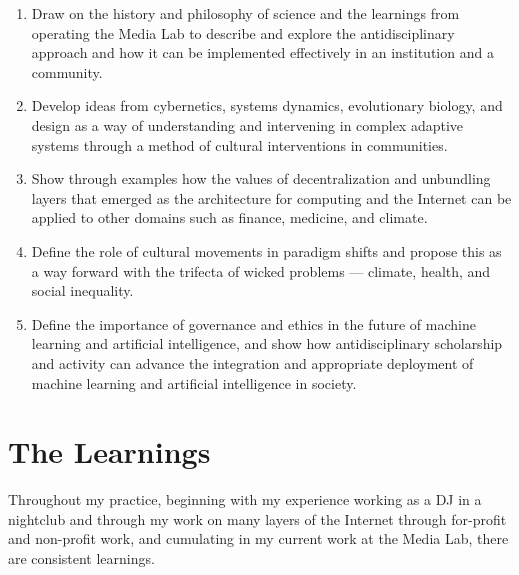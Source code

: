 \begin{enumerate}
\item Draw on the history and philosophy of science and the learnings from operating the Media Lab to describe and explore the antidisciplinary approach and how it can be implemented effectively in an institution and a community.
\item Develop ideas from cybernetics, systems dynamics, evolutionary biology, and design as a way of understanding and intervening in complex adaptive systems through a method of cultural interventions in communities.
\item Show through examples how the values of decentralization and unbundling layers that emerged as the architecture for computing and the Internet can be applied to other domains such as finance, medicine, and climate.
\item Define the role of cultural movements in paradigm shifts and propose this as a way forward with the trifecta of wicked problems --- climate, health, and social inequality.
\item Define the importance of governance and ethics in the future of machine learning and artificial intelligence, and show how antidisciplinary scholarship and activity can advance the integration and appropriate deployment of machine learning and artificial intelligence in society.
\end{enumerate}

\section{The Learnings}

Throughout my practice, beginning with my experience working as a DJ in a nightclub and through my work on many layers of the Internet through for-profit and non-profit work, and cumulating in my current work at the Media Lab, there are consistent learnings.

